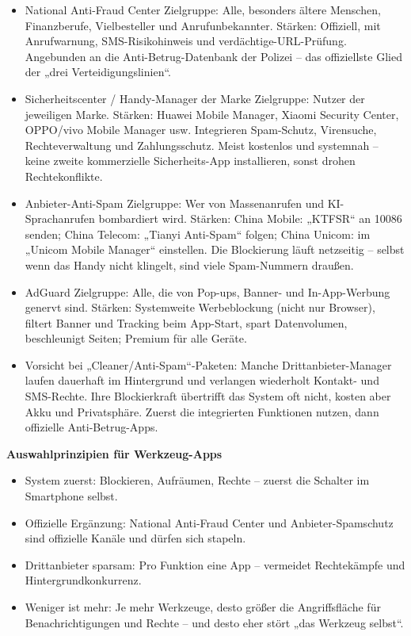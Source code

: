 \begin{itemize}
  \item National Anti-Fraud Center Zielgruppe: Alle, besonders ältere Menschen, Finanzberufe, Vielbesteller und Anrufunbekannter. Stärken: Offiziell, mit Anrufwarnung, SMS-Risikohinweis und verdächtige-URL-Prüfung. Angebunden an die Anti-Betrug-Datenbank der Polizei – das offiziellste Glied der „drei Verteidigungslinien“.
  \item Sicherheitscenter / Handy-Manager der Marke Zielgruppe: Nutzer der jeweiligen Marke. Stärken: Huawei Mobile Manager, Xiaomi Security Center, OPPO/vivo Mobile Manager usw. Integrieren Spam-Schutz, Virensuche, Rechteverwaltung und Zahlungsschutz. Meist kostenlos und systemnah – keine zweite kommerzielle Sicherheits-App installieren, sonst drohen Rechtekonflikte.
  \item Anbieter-Anti-Spam Zielgruppe: Wer von Massenanrufen und KI-Sprachanrufen bombardiert wird. Stärken: China Mobile: „KTFSR“ an 10086 senden; China Telecom: „Tianyi Anti-Spam“ folgen; China Unicom: im „Unicom Mobile Manager“ einstellen. Die Blockierung läuft netzseitig – selbst wenn das Handy nicht klingelt, sind viele Spam-Nummern draußen.
  \item AdGuard Zielgruppe: Alle, die von Pop-ups, Banner- und In-App-Werbung genervt sind. Stärken: Systemweite Werbeblockung (nicht nur Browser), filtert Banner und Tracking beim App-Start, spart Datenvolumen, beschleunigt Seiten; Premium für alle Geräte.
  \item Vorsicht bei „Cleaner/Anti-Spam“-Paketen: Manche Drittanbieter-Manager laufen dauerhaft im Hintergrund und verlangen wiederholt Kontakt- und SMS-Rechte. Ihre Blockierkraft übertrifft das System oft nicht, kosten aber Akku und Privatsphäre. Zuerst die integrierten Funktionen nutzen, dann offizielle Anti-Betrug-Apps.
\end{itemize}

\textbf{Auswahlprinzipien für Werkzeug-Apps}\par

\begin{itemize}
  \item System zuerst: Blockieren, Aufräumen, Rechte – zuerst die Schalter im Smartphone selbst.
  \item Offizielle Ergänzung: National Anti-Fraud Center und Anbieter-Spamschutz sind offizielle Kanäle und dürfen sich stapeln.
  \item Drittanbieter sparsam: Pro Funktion eine App – vermeidet Rechtekämpfe und Hintergrundkonkurrenz.
  \item Weniger ist mehr: Je mehr Werkzeuge, desto größer die Angriffsfläche für Benachrichtigungen und Rechte – und desto eher stört „das Werkzeug selbst“.
\end{itemize}

